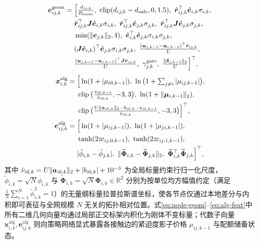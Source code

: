 \begin{equation}
\begin{split}
 \boldsymbol e_{ij,k}^{\mathrm{geom}}&=\Big[\tfrac{d_{ij,k}}{R_{\mathrm{sense}}},\ \clip(d_{ij,k}-\ds,0,1.5),\ \hat{\br}_{ij,k}^{\top}\hat{\be}_{i,k}\sigma_{i,k},\\
 &\quad\ \hat{\br}_{ij,k}^{\top}\bJ\hat{\be}_{i,k}\sigma_{i,k},\ \hat{\br}_{ij,k}^{\top}\hat{\be}_{j,k}\sigma_{j,k},\ \hat{\br}_{ij,k}^{\top}\bJ\hat{\be}_{j,k}\sigma_{j,k},\\
 &\quad\ \min(\norm{\be_{j,k}}_2,4),\ \hat{\be}_{i,k}^{\top}\hat{\be}_{j,k}\sigma_{i,k}\sigma_{j,k},\\
 &\quad\ (\bJ\hat{\be}_{i,k})^{\top}\hat{\be}_{j,k}\sigma_{i,k}\sigma_{j,k},\ \tfrac{(\bu_{j,k-1}-\bu_{i,k-1})^{\top}\hat{\br}_{ij,k}}{U},\\
 &\quad\ \tfrac{(\bu_{j,k-1}-\bu_{i,k-1})^{\top}\bJ\hat{\br}_{ij,k}}{U},\ \gamma_{j,k}^{\mathrm{gate}},\ \tfrac{\norm{\boldsymbol\delta_{j,k-1}}_2}{U}\Big]^{\top},
\end{split}\label{eq:edge-geom}
\end{equation}
\begin{equation}
\begin{split}
 \boldsymbol x_{i,k}^{\mathrm{alg}}&=\Big[\ln(1+|\mu_{i0,k-1}|),\ \ln\big(1+\textstyle\sum_{j\ne i}|\mu_{ij,k-1}|\big),\\
 &\quad\ \clip\big(\tfrac{s_{i0,k-1}}{\bar\nu_{i0,k}},-3,3\big),\ \ln(1+\norm{\boldsymbol\mu_{i,k-1}}_2),\\
 &\quad\ \clip\big(\tfrac{U\norm{\boldsymbol a_{i0,k}}_2-b_{i0,k}-s_{i0,k-1}}{\bar\nu_{i0,k}},-3,3\big)\Big]^{\top},\\
 \boldsymbol e_{ij,k}^{\mathrm{alg}}&=\Big[\ln(1+|\mu_{ij,k-1}|),\ \ln(1+|\mu_{ji,k-1}|),\\
 &\quad\ \tanh(2\varpi_{ij,0,k-1}),\ \tanh(2\varpi_{ij,1,k-1}),\\
 &\quad\ |\tilde\phi_{i,k}-\tilde\phi_{j,k}|,\ \norm{\widetilde{\boldsymbol\Phi}_{i,k}-\widetilde{\boldsymbol\Phi}_{j,k}}_2,\ \widetilde{\boldsymbol\Phi}_{i,k}^{\top}\widetilde{\boldsymbol\Phi}_{j,k}\Big]^{\top},
\end{split}\label{eq:alg-feat}
\end{equation}
其中 $\bar\nu_{i0,k}=U\lVert\boldsymbol a_{i0,k}\rVert_2+|b_{i0,k}|+10^{-3}$ 为全局标量约束行归一化尺度，$\tilde\phi_{i,k}=\sqrt{N}\phi_{i,k}$ 与 $\widetilde{\boldsymbol\Phi}_{i,k}=\sqrt{N}\boldsymbol\Phi_{i,k}\in\mathbb R^2$ 分别为按单位均方幅值约定（满足 $\frac1N\sum_{i=1}^N\tilde\phi_{i,k}^2=1$）的无量纲标量拉普拉斯谱坐标，使各节点仅通过本地差分与内积即可表征与全网规模 $N$ 无关的拓扑相对位置。式\eqref{eq:node-geom}--\eqref{eq:alg-feat}中所有二维几何向量均通过局部正交标架内积化为刚体不变标量；代数子向量 $\boldsymbol x_{i,k}^{\mathrm{alg}},\boldsymbol e_{ij,k}^{\mathrm{alg}}$ 则向策略网络显式暴露各接触边的紧迫度影子价格 $\mu_{ij,k-1}$ 与配额储备状态。

